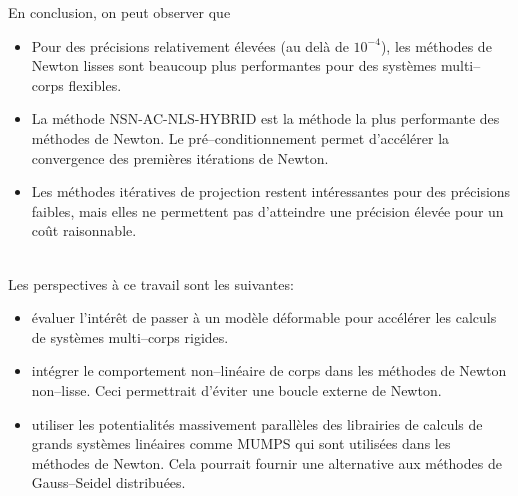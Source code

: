 \documentclass{CSMA2017}
\newcommand\red[1]{\textcolor{red}{#1}}
\begin{document}
En conclusion, on peut observer que 
\begin{itemize}
\item Pour des précisions relativement élevées (au delà de $10^{-4}$), les méthodes de Newton lisses sont beaucoup plus performantes pour des systèmes multi--corps flexibles.
\item La méthode {\sf\small NSN-AC-NLS-HYBRID} est la méthode la plus performante des méthodes de Newton. Le pré--conditionnement permet d'accélérer la convergence des premières itérations de Newton.

\item Les méthodes itératives de projection restent intéressantes pour des précisions faibles, mais elles ne permettent pas d'atteindre une précision élevée pour un coût raisonnable.
\end{itemize}
\ \\
Les perspectives à ce travail sont les suivantes:
\begin{itemize}
\item évaluer l'intérêt de passer à un modèle déformable pour accélérer les calculs de systèmes multi--corps rigides. \marginpar{\red{c'était dans l'intro mais on a pas eu le temps ==> reprendre l'intro} }
\item intégrer le comportement non--linéaire de corps dans les méthodes de Newton non--lisse. Ceci permettrait d'éviter une boucle externe de Newton.
\item utiliser les potentialités massivement parallèles des librairies de calculs de grands systèmes linéaires comme MUMPS qui sont utilisées dans les méthodes de Newton. Cela pourrait fournir une alternative aux méthodes de Gauss--Seidel distribuées.
\end{itemize}










\end{document}
